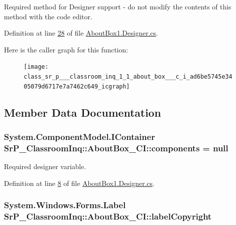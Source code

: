 \-Required method for \-Designer support -\/ do not modify the contents of this method with the code editor. 



\-Definition at line \hyperlink{_about_box1_8_designer_8cs_source_l00028}{28} of file \hyperlink{_about_box1_8_designer_8cs_source}{\-About\-Box1.\-Designer.\-cs}.



\-Here is the caller graph for this function\-:
\nopagebreak
\begin{figure}[H]
\begin{center}
\leavevmode
\texttt{[image: class\_sr\_p\_\_\_classroom\_inq\_1\_1\_about\_box\_\_\_c\_i\_ad6be5745e3405079d6717e7a7462c649\_icgraph]}
\end{center}
\end{figure}




\subsection{\-Member \-Data \-Documentation}
\hypertarget{class_sr_p___classroom_inq_1_1_about_box___c_i_a988e74f2099fc5a7a3c4acd218b4c471}{
\subsubsection[{components}]{\setlength{\rightskip}{0pt plus 5cm}\-System.\-Component\-Model.\-I\-Container {\bf \-Sr\-P\-\_\-\-Classroom\-Inq\-::\-About\-Box\-\_\-\-C\-I\-::components} = null}}
\label{class_sr_p___classroom_inq_1_1_about_box___c_i_a988e74f2099fc5a7a3c4acd218b4c471}


\-Required designer variable. 



\-Definition at line \hyperlink{_about_box1_8_designer_8cs_source_l00008}{8} of file \hyperlink{_about_box1_8_designer_8cs_source}{\-About\-Box1.\-Designer.\-cs}.

\hypertarget{class_sr_p___classroom_inq_1_1_about_box___c_i_ab98fc181f4cf9c79b0c1459c04caeb70}{
\subsubsection[{label\-Copyright}]{\setlength{\rightskip}{0pt plus 5cm}\-System.\-Windows.\-Forms.\-Label {\bf \-Sr\-P\-\_\-\-Classroom\-Inq\-::\-About\-Box\-\_\-\-C\-I\-::label\-Copyright}}}
\label{class_sr_p___classroom_inq_1_1_about_box___c_i_ab98fc181f4cf9c79b0c1459c04caeb70}


